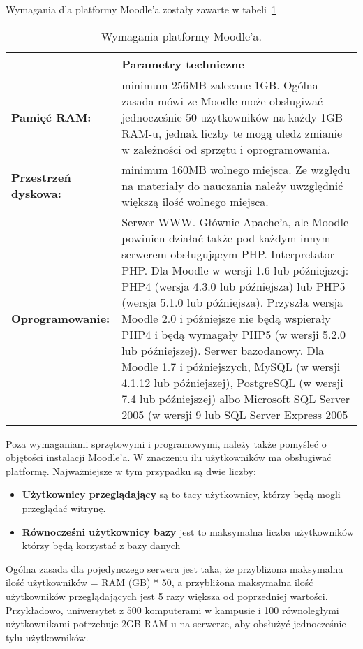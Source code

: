 Wymagania dla platformy Moodle'a zostały zawarte w tabeli~\ref{tab:wymagania_sprzetowe} \\
	\begin{table}[!h]
		\centering
		\caption{Wymagania platformy Moodle'a.}
		\label{tab:wymagania_sprzetowe}
		\begin{tabular}{|l|p{10cm}|} \hline
		 & \textbf{Parametry techniczne} \\ \hline
			\textbf{Pamięć RAM:} & minimum 256MB zalecane 1GB. Ogólna zasada mówi ze Moodle może obsługiwać jednocześnie 50 użytkowników na każdy 1GB RAM-u, jednak liczby te mogą uledz zmianie w zależności od sprzętu i oprogramowania. \\ \hline
			\textbf{Przestrzeń dyskowa:} & minimum 160MB wolnego miejsca. Ze względu na materiały do nauczania należy uwzględnić większą ilość wolnego miejsca. \\ \hline
			\textbf{Oprogramowanie:} & Serwer WWW. Głównie Apache'a, ale Moodle powinien działać także pod każdym innym serwerem obsługującym PHP. Interpretator PHP. Dla Moodle w wersji 1.6 lub późniejszej: PHP4 (wersja 4.3.0 lub późniejsza) lub PHP5 (wersja 5.1.0 lub późniejsza). Przyszła wersja Moodle 2.0 i późniejsze nie będą wspierały PHP4 i będą wymagały PHP5 (w wersji 5.2.0 lub późniejszej). Serwer bazodanowy. Dla Moodle 1.7 i późniejszych, MySQL (w wersji 4.1.12 lub późniejszej), PostgreSQL (w wersji 7.4 lub późniejszej) albo Microsoft SQL Server 2005 (w wersji 9 lub SQL Server Express 2005 \\ \hline
		\end{tabular}
	\end{table}
Poza wymaganiami sprzętowymi i programowymi, należy także pomyśleć o objętości instalacji Moodle'a. W znaczeniu ilu użytkowników ma obsługiwać platformę. Najważniejsze w tym przypadku są dwie liczby: \\
	\begin{itemize}
		\item \textbf{Użytkownicy przeglądający} są to tacy użytkownicy, którzy będą mogli przeglądać witrynę.
		\item \textbf{Równocześni użytkownicy bazy} jest to maksymalna liczba użytkowników którzy będą korzystać z bazy danych  
	\end{itemize}
Ogólna zasada dla pojedynczego serwera jest taka, że przybliżona maksymalna ilość użytkowników = RAM (GB) * 50, a przybliżona maksymalna ilość użytkowników przeglądających jest 5 razy większa od poprzedniej wartości. Przykładowo, uniwersytet z 500 komputerami w kampusie i 100 równoległymi użytkownikami potrzebuje 2GB RAM-u na serwerze, aby obsłużyć jednocześnie tylu użytkowników\cite{dokumentacja_moodle}. \\

